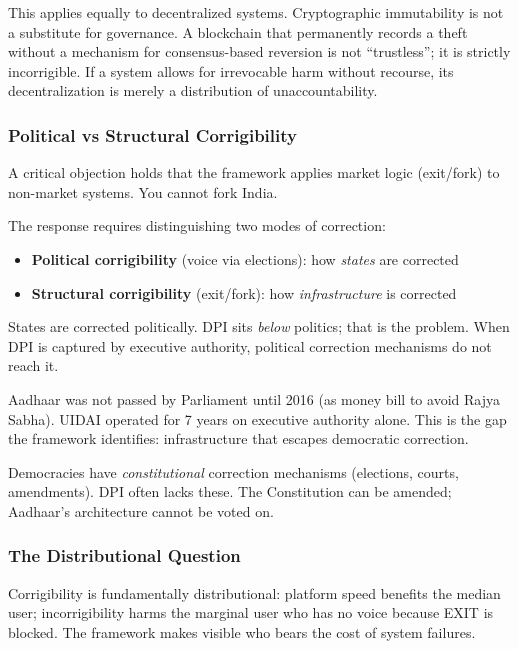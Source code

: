 \documentclass{article}
\begin{document}
This applies equally to decentralized systems. Cryptographic immutability is not a substitute for governance. A blockchain that permanently records a theft without a mechanism for consensus-based reversion is not ``trustless''; it is strictly incorrigible. If a system allows for irrevocable harm without recourse, its decentralization is merely a distribution of unaccountability.

\subsubsection{Political vs Structural Corrigibility}
\label{subsec:political-structural}

A critical objection holds that the framework applies market logic (exit/fork) to non-market systems. You cannot fork India.

The response requires distinguishing two modes of correction:

\begin{itemize}
    \item \textbf{Political corrigibility} (voice via elections): how \textit{states} are corrected
    \item \textbf{Structural corrigibility} (exit/fork): how \textit{infrastructure} is corrected
\end{itemize}

States are corrected politically. DPI sits \textit{below} politics; that is the problem. When DPI is captured by executive authority, political correction mechanisms do not reach it.

Aadhaar was not passed by Parliament until 2016 (as money bill to avoid Rajya Sabha). UIDAI operated for 7 years on executive authority alone. This is the gap the framework identifies: infrastructure that escapes democratic correction.

Democracies have \textit{constitutional} correction mechanisms (elections, courts, amendments). DPI often lacks these. The Constitution can be amended; Aadhaar's architecture cannot be voted on.

\subsubsection{The Distributional Question}
\label{subsec:distributional}

Corrigibility is fundamentally distributional: platform speed benefits the median user; incorrigibility harms the marginal user who has no voice because EXIT is blocked. The framework makes visible who bears the cost of system failures.
\end{document}
